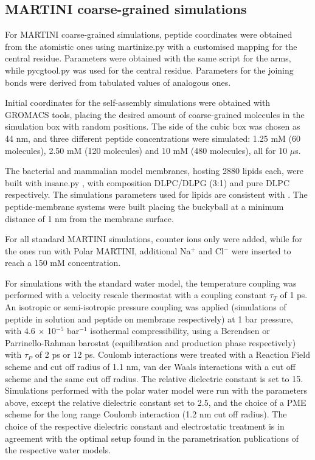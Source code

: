 \subsection{MARTINI coarse-grained simulations} \label{sec:MARTINI_sim_det}
For MARTINI \citep{Marrink2007, Monticelli2008} coarse-grained simulations, peptide coordinates were obtained from the atomistic ones using martinize.py \citep{DeJong2013} with a customised mapping for the central residue. Parameters were obtained with the same script for the arms, while pycgtool.py \citep{Graham2017} was used for the central residue. Parameters for the joining bonds were derived from tabulated values of analogous ones.

Initial coordinates for the self-assembly simulations were obtained with GROMACS tools, placing the desired amount of coarse-grained molecules in the simulation box with random positions.
%
The side of the cubic box was chosen as 44 nm, and three different peptide concentrations were simulated: 1.25 mM (60 molecules), 2.50 mM (120 molecules) and 10 mM (480 molecules), all for 10 $\mu$s.

The bacterial and mammalian model membranes, hosting 2880 lipids each, were built with insane.py \citep{Wassenaar2015}, with composition DLPC/DLPG (3:1) and pure DLPC respectively. The simulations parameters used for lipids are consistent with \citet{SiewertJ.Marrink2003}. The peptide-membrane systems were built placing the buckyball at a minimum distance of 1 nm from the membrane surface.

For all standard MARTINI simulations, counter ions only were added, while for the ones run with Polar MARTINI, additional Na$^+$ and Cl$^-$ were inserted to reach a 150 mM concentration.

For simulations with the standard water model, the temperature coupling was performed with a velocity rescale thermostat \citep{Bussi2007} with a coupling constant $\tau _T$ of 1 ps. An isotropic or semi-isotropic pressure coupling was applied (simulations of peptide in solution and peptide on membrane respectively) at 1 bar pressure, with 4.6 $\times$ 10$^{-5}$ bar$^{-1}$ isothermal compressibility, using a Berendsen \citep{Berendsen1984} or Parrinello-Rahman barostat \citep{Parrinello1981} (equilibration and production phase respectively) with $\tau _P$ of 2 ps or 12 ps.
%
Coulomb interactions were treated with a Reaction Field scheme \citep{Tironi1995} and cut off radius of 1.1 nm, van der Waals interactions with a cut off scheme and the same cut off radius. The relative dielectric constant is set to 15.
%
Simulations performed with the polar water model were run with the parameters above, except the relative dielectric constant set to 2.5, and the choice of a PME scheme for the long range Coulomb interaction (1.2 nm cut off radius).
The choice of the respective dielectric constant and electrostatic treatment is in agreement with the optimal setup found in the parametrisation publications of the respective water models.

